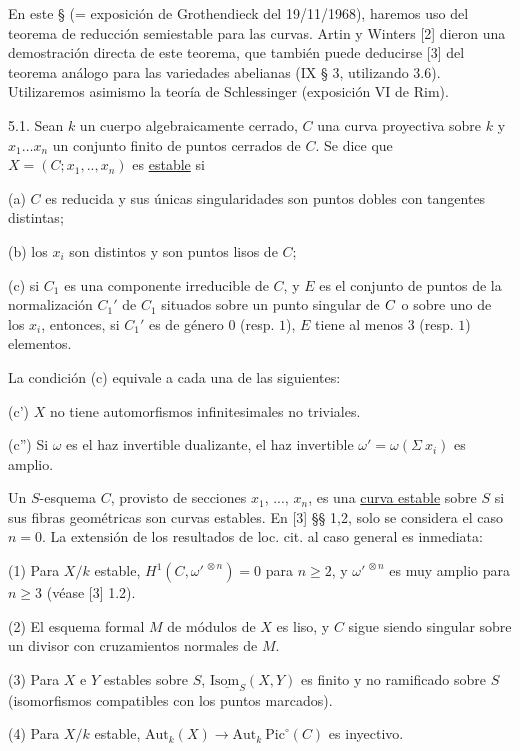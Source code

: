 En este § (= exposición de Grothendieck del 19/11/1968), haremos uso del teorema de reducción semiestable para las curvas. Artin y Winters [2] dieron una demostración directa de este teorema, que también puede deducirse [3] del teorema análogo para las variedades abelianas (IX § 3, utilizando 3.6). Utilizaremos asimismo la teoría de Schlessinger (exposición VI de Rim).

5.1.  Sean $k$ un cuerpo algebraicamente cerrado, $C$ una curva proyectiva sobre $k$ y $x_1 \ldots x_n$ un conjunto finito de puntos cerrados de $C$. Se dice que $X = (C ; x_1,.., x_n)$ es \underline{estable} si

(a) $C$ es reducida y sus únicas singularidades son puntos dobles con tangentes distintas;

(b) los $x_i$ son distintos y son puntos lisos de $C$;

(c) si $C_1$ es una componente irreducible de $C$, y $E$ es el conjunto de puntos de la normalización $C_1'$ de $C_1$ situados sobre un punto singular de $\sisi{C_1}{C}$ o sobre uno de los $x_i$, entonces, si $C_1'$ es de género $0$ (resp. $1$), $E$ tiene al menos $3$ (resp. $1$) elementos.

La condición (c) equivale a cada una de las siguientes:

(c')  $X$ no tiene automorfismos infinitesimales no triviales.

(c'')  Si $\omega$ es el haz invertible dualizante, el haz invertible $\omega' = \omega(\Sigma\ x_i)$ es amplio.

Un $S$-esquema $C$, provisto de secciones $x_1$, ..., $x_n$, es una \underline{curva estable} sobre $S$ si sus fibras geométricas son curvas estables. En [3] §§ 1,2, solo se considera el caso $n = 0$. La extensión de los resultados de loc. cit. al caso general es inmediata:

(1) Para $X/k$ estable, $H^1(C,\omega'^{\,\otimes n}) = 0$ para $n \geqslant 2$, y $\omega'^{\,\otimes n}$ es muy amplio para $n \geqslant 3$ (véase [3] 1.2).

(2) El esquema formal $M$ de módulos de $X$ es liso, y $C$ sigue siendo singular sobre un divisor con cruzamientos normales de $M$.



(3) Para $X$ e $Y$ estables sobre $S$, $\mathrm{I}\underline{\mathrm{som}}_{S}(X,Y)$ es finito y no ramificado sobre $S$ (isomorfismos compatibles con los puntos marcados).

(4) Para $X/k$ estable, $\mathrm{Aut}_k(X) \longrightarrow \mathrm{Aut}_k\ \mathrm{Pic}^{\circ}(C)$ es inyectivo.

